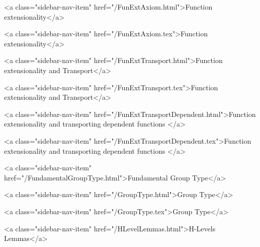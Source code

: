       
    
      
        
          <a class="sidebar-nav-item" href="/FunExtAxiom.html">Function extensionality</a>
        
      
    
      
        
          <a class="sidebar-nav-item" href="/FunExtAxiom.tex">Function extensionality</a>
        
      
    
      
        
          <a class="sidebar-nav-item" href="/FunExtTransport.html">Function extensionality and Transport</a>
        
      
    
      
        
          <a class="sidebar-nav-item" href="/FunExtTransport.tex">Function extensionality and Transport</a>
        
      
    
      
        
          <a class="sidebar-nav-item" href="/FunExtTransportDependent.html">Function extensionality and transporting dependent functions </a>
        
      
    
      
        
          <a class="sidebar-nav-item" href="/FunExtTransportDependent.tex">Function extensionality and transporting dependent functions </a>
        
      
    
      
        
          <a class="sidebar-nav-item" href="/FundamentalGroupType.html">Fundamental Group Type</a>
        
      
    
      
        
          <a class="sidebar-nav-item" href="/GroupType.html">Group Type</a>
        
      
    
      
        
          <a class="sidebar-nav-item" href="/GroupType.tex">Group Type</a>
        
      
    
      
        
          <a class="sidebar-nav-item" href="/HLevelLemmas.html">H-Levels Lemmas</a>
        
      
    
